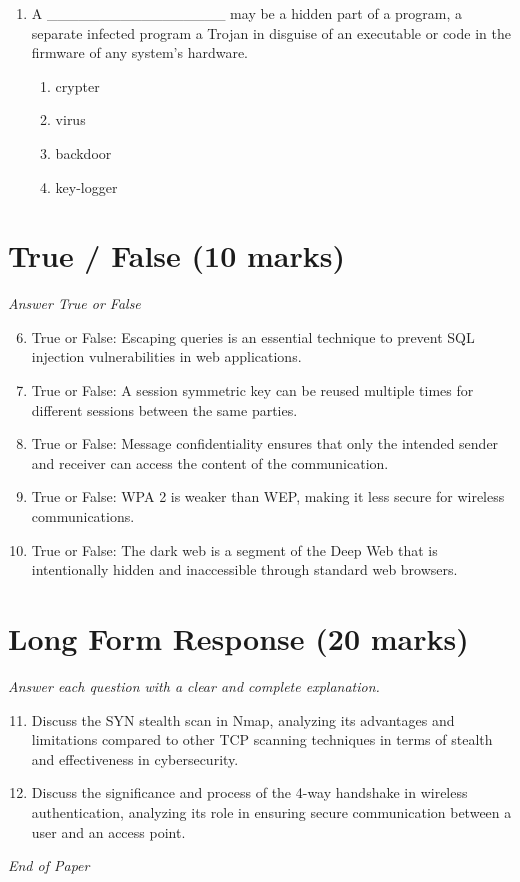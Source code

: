 \documentclass[12pt]{article}
\begin{document}
\begin{enumerate}[label=\arabic*.]
\begin{enumerate}[label=(\alph*)]
    \item buffer checks
\end{enumerate}
\item A \_\_\_\_\_\_\_\_\_\_\_\_\_\_\_\_\_ may be a hidden part of a program, a separate infected program a Trojan in disguise of an executable or code in the firmware of any system's hardware.
\begin{enumerate}[label=(\alph*)]
    \item crypter
    \item virus
    \item backdoor
    \item key-logger
\end{enumerate}
\end{enumerate}

\section*{True / False (10 marks)}
\textit{Answer True or False}
\begin{enumerate}[label=\arabic*.]
\setcounter{enumi}{5}
\item True or False: Escaping queries is an essential technique to prevent SQL injection vulnerabilities in web applications.
\item True or False: A session symmetric key can be reused multiple times for different sessions between the same parties.
\item True or False: Message confidentiality ensures that only the intended sender and receiver can access the content of the communication.
\item True or False: WPA 2 is weaker than WEP, making it less secure for wireless communications.
\item True or False: The dark web is a segment of the Deep Web that is intentionally hidden and inaccessible through standard web browsers.
\end{enumerate}

\section*{Long Form Response (20 marks)}
\textit{Answer each question with a clear and complete explanation.}
\begin{enumerate}[label=\arabic*.]
\setcounter{enumi}{10}
\item Discuss the SYN stealth scan in Nmap, analyzing its advantages and limitations compared to other TCP scanning techniques in terms of stealth and effectiveness in cybersecurity.
\item Discuss the significance and process of the 4-way handshake in wireless authentication, analyzing its role in ensuring secure communication between a user and an access point.
\end{enumerate}

\vfill
\noindent\textit{End of Paper}
\end{document}
